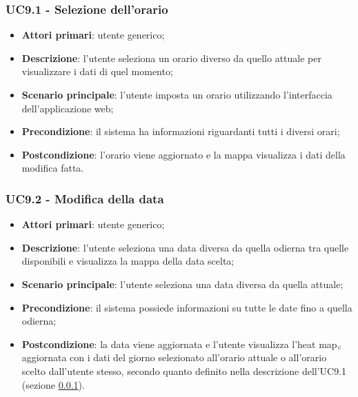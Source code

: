\subsubsection{UC9.1 - Selezione dell’orario}\label{CasiDUsoCasiDUsoTraUnUtenteEIlFrontEndElencoCasiDUsoUC51SelezioneDellOrario}
\begin{itemize}
	\item \textbf{Attori primari}: utente generico;
	\item \textbf{Descrizione}: l’utente seleziona un orario diverso da quello attuale per visualizzare i dati di quel momento;
	\item \textbf{Scenario principale}: l’utente imposta un orario utilizzando l’interfaccia dell’applicazione web;
	\item \textbf{Precondizione}: il sistema ha informazioni riguardanti tutti i diversi orari; %
	\item \textbf{Postcondizione}: l’orario viene aggiornato e la mappa visualizza i dati della modifica fatta.
\end{itemize}

\subsubsection{UC9.2 - Modifica della data}\label{CasiDUsoCasiDUsoTraUnUtenteEIlFrontEndElencoCasiDUsoUC52ModificaDellaData}
\begin{itemize}
	\item \textbf{Attori primari}: utente generico;
	\item \textbf{Descrizione}: l’utente seleziona una data diversa da quella odierna tra quelle disponibili e visualizza la mappa della data scelta;
	\item \textbf{Scenario principale}: l’utente seleziona una data diversa da quella attuale;
	\item \textbf{Precondizione}: il sistema possiede informazioni su tutte le date fino a quella odierna;
	\item \textbf{Postcondizione}: la data viene aggiornata e l’utente visualizza l’heat map$_{\scaleto{G}{3pt}}$ aggiornata con i dati del giorno selezionato all’orario attuale o all’orario scelto dall’utente stesso, secondo quanto definito nella descrizione dell’UC9.1 (sezione \ref{CasiDUsoCasiDUsoTraUnUtenteEIlFrontEndElencoCasiDUsoUC51SelezioneDellOrario}).
\end{itemize}


